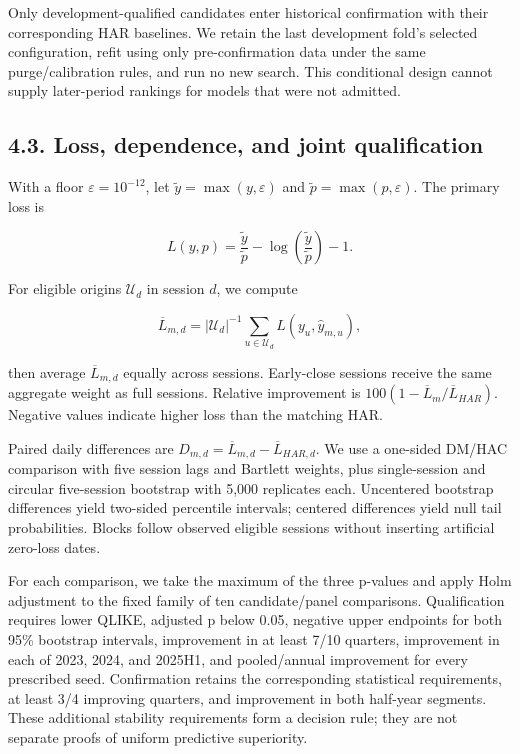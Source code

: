 Only development-qualified candidates enter historical confirmation with
their corresponding HAR baselines. We retain the last development fold's
selected configuration, refit using only pre-confirmation data under the
same purge/calibration rules, and run no new search. This conditional
design cannot supply later-period rankings for models that were not
admitted.

\subsection{4.3. Loss, dependence, and joint
qualification}\label{loss-dependence-and-joint-qualification}

With a floor \(\varepsilon=10^{-12}\), let
\(\widetilde y=\max(y,\varepsilon)\) and
\(\widetilde p=\max(p,\varepsilon)\). The primary loss is

\[
L(y,p)=\frac{\widetilde y}{\widetilde p}
-\log\!\left(\frac{\widetilde y}{\widetilde p}\right)-1.
\]

For eligible origins \(\mathcal U_d\) in session \(d\), we compute

\[
\overline L_{m,d}=|\mathcal U_d|^{-1}
\sum_{u\in\mathcal U_d}L(y_u,\widehat y_{m,u}),
\]

then average \(\overline L_{m,d}\) equally across sessions. Early-close
sessions receive the same aggregate weight as full sessions. Relative
improvement is \(100(1-\overline L_m/\overline L_{HAR})\). Negative
values indicate higher loss than the matching HAR.

Paired daily differences are
\(D_{m,d}=\overline L_{m,d}-\overline L_{HAR,d}\). We use a one-sided
DM/HAC comparison with five session lags and Bartlett weights, plus
single-session and circular five-session bootstrap with 5,000 replicates
each. Uncentered bootstrap differences yield two-sided percentile
intervals; centered differences yield null tail probabilities. Blocks
follow observed eligible sessions without inserting artificial zero-loss
dates.

For each comparison, we take the maximum of the three p-values and apply
Holm adjustment to the fixed family of ten candidate/panel comparisons.
Qualification requires lower QLIKE, adjusted p below 0.05, negative
upper endpoints for both 95\% bootstrap intervals, improvement in at
least 7/10 quarters, improvement in each of 2023, 2024, and 2025H1, and
pooled/annual improvement for every prescribed seed. Confirmation
retains the corresponding statistical requirements, at least 3/4
improving quarters, and improvement in both half-year segments. These
additional stability requirements form a decision rule; they are not
separate proofs of uniform predictive superiority.

